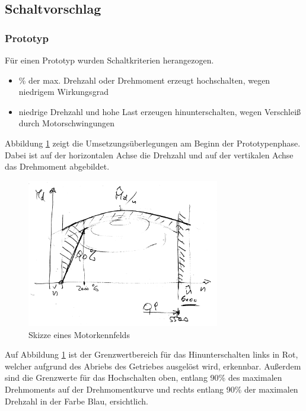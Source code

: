 \subsection{Schaltvorschlag}
\label{subsec:schaltvorschlag}

\subsubsection{Prototyp}
Für einen Prototyp wurden Schaltkriterien herangezogen.

\begin{itemize}
	\item {}\% der max. Drehzahl oder Drehmoment erzeugt hochschalten, wegen niedrigem Wirkungsgrad
	\item niedrige Drehzahl und hohe Last erzeugen hinunterschalten, wegen Verschleiß durch Motorschwingungen\grqq
\end{itemize}

Abbildung \ref{fig:imgEngineEfficiencyGraph} zeigt die Umsetzungsüberlegungen am Beginn der Prototypenphase. Dabei ist auf der horizontalen Achse die Drehzahl und auf der vertikalen Achse das Drehmoment abgebildet.
\begin{figure}[!htb]\centering
		\includegraphics[width=0.75\textwidth]{images/motorkennfeldSkizze}
		\caption{Skizze eines Motorkennfelds} \label{fig:imgEngineEfficiencyGraph}
\end{figure}
Auf Abbildung \ref{fig:imgEngineEfficiencyGraph} ist der Grenzwertbereich für das Hinunterschalten links in Rot, welcher aufgrund des Abriebs des Getriebes ausgelöst wird, erkennbar. Außerdem sind die Grenzwerte für das Hochschalten oben, entlang 90\% des maximalen Drehmoments auf der Drehmomentkurve und rechts entlang 90\% der maximalen Drehzahl in der Farbe Blau, ersichtlich.

